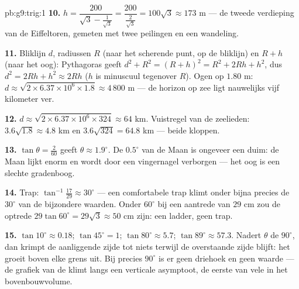 \begin{solution}{pb:g9:trig:1}
\textbf{10.} $h = \dfrac{200}{\sqrt3 - \frac{1}{\sqrt3}}
= \dfrac{200}{\frac{2}{\sqrt3}} = 100\sqrt3 \approx 173$ m --- de tweede
verdieping van de Eiffeltoren, gemeten met twee peilingen en een wandeling.

\textbf{11.} Bliklijn $d$, radiussen $R$ (naar het scherende punt,  op de
bliklijn) en $R + h$ (naar het oog): Pythagoras geeft
$d^2 + R^2 = (R + h)^2 = R^2 + 2Rh + h^2$, dus
$d^2 = 2Rh + h^2 \approx 2Rh$ ($h$ is minuscuul tegenover $R$). Ogen op $1.80$ m:
$d \approx \sqrt{2 \times 6.37 \times 10^6 \times 1.8} \approx 4\,800$ m --- de
horizon op zee ligt nauwelijks vijf kilometer ver.

\textbf{12.} $d \approx \sqrt{2 \times 6.37 \times 10^6 \times 324} \approx 64$
km. Vuistregel van de zeelieden: $3.6\sqrt{1.8} \approx 4.8$ km en
$3.6\sqrt{324} = 64.8$ km --- beide kloppen.

\textbf{13.} $\tan\theta = \frac{2}{60}$ geeft $\theta \approx 1.9^\circ$. De
$0.5^\circ$ van de Maan is ongeveer een \emph{} duim: de Maan lijkt enorm en
wordt door een vingernagel verborgen --- het oog is een slechte gradenboog.

\textbf{14.} Trap: $\tan^{-1}\frac{17}{29} \approx 30^\circ$ --- een comfortabele
trap klimt onder bijna precies de $30^\circ$ van de bijzondere waarden. Onder
$60^\circ$ bij een aantrede van $29$ cm zou de optrede
$29\tan 60^\circ = 29\sqrt3 \approx 50$ cm zijn: een ladder, geen trap.

\textbf{15.} $\tan 10^\circ \approx 0.18$; $\tan 45^\circ = 1$;
$\tan 80^\circ \approx 5.7$; $\tan 89^\circ \approx 57.3$. Nadert $\theta$ de
$90^\circ$, dan krimpt de aanliggende zijde tot niets terwijl de overstaande zijde
blijft: het  groeit boven elke grens uit. Bij precies $90^\circ$ is er geen
driehoek en geen waarde --- de grafiek van de  klimt langs een verticale
asymptoot, de eerste van vele in het bovenbouwvolume.
\end{solution}
